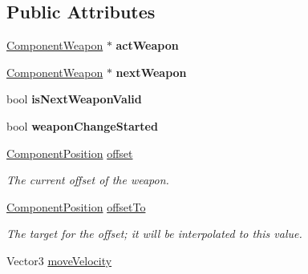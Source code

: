 \subsection*{\-Public \-Attributes}
\begin{DoxyCompactItemize}
\item 
\hypertarget{classWeaponInHand_aa2402590077403d4262c1f26532a0a18}{
\hyperlink{classComponentWeapon}{\-Component\-Weapon} $\ast$ {\bfseries act\-Weapon}}
\label{dc/d08/classWeaponInHand_aa2402590077403d4262c1f26532a0a18}

\item 
\hypertarget{classWeaponInHand_aed2ba79eeb8b5e45b6dfa3106e9bfd83}{
\hyperlink{classComponentWeapon}{\-Component\-Weapon} $\ast$ {\bfseries next\-Weapon}}
\label{dc/d08/classWeaponInHand_aed2ba79eeb8b5e45b6dfa3106e9bfd83}

\item 
\hypertarget{classWeaponInHand_a217b1a4cd5d5d793a939d3a9abecc4bb}{
bool {\bfseries is\-Next\-Weapon\-Valid}}
\label{dc/d08/classWeaponInHand_a217b1a4cd5d5d793a939d3a9abecc4bb}

\item 
\hypertarget{classWeaponInHand_a0eaad1b09528cd430a02180aea0a2b80}{
bool {\bfseries weapon\-Change\-Started}}
\label{dc/d08/classWeaponInHand_a0eaad1b09528cd430a02180aea0a2b80}

\item 
\hypertarget{classWeaponInHand_a4ab7ef76f0c9deae5b8cb2c4784aab35}{
\hyperlink{classComponentPosition}{\-Component\-Position} \hyperlink{classWeaponInHand_a4ab7ef76f0c9deae5b8cb2c4784aab35}{offset}}
\label{dc/d08/classWeaponInHand_a4ab7ef76f0c9deae5b8cb2c4784aab35}

\begin{DoxyCompactList}\small\item\em \-The current offset of the weapon. \end{DoxyCompactList}\item 
\hypertarget{classWeaponInHand_aa39e0c3fd56bc59f67e8f4d051c3ce8d}{
\hyperlink{classComponentPosition}{\-Component\-Position} \hyperlink{classWeaponInHand_aa39e0c3fd56bc59f67e8f4d051c3ce8d}{offset\-To}}
\label{dc/d08/classWeaponInHand_aa39e0c3fd56bc59f67e8f4d051c3ce8d}

\begin{DoxyCompactList}\small\item\em \-The target for the offset; it will be interpolated to this value. \end{DoxyCompactList}\item 
\hypertarget{classWeaponInHand_adfc64d03eedc9f503de59d2defd070dd}{
\-Vector3 \hyperlink{classWeaponInHand_adfc64d03eedc9f503de59d2defd070dd}{move\-Velocity}}
\label{dc/d08/classWeaponInHand_adfc64d03eedc9f503de59d2defd070dd}


\end{DoxyCompactItemize}
